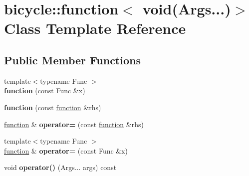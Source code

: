 \hypertarget{classbicycle_1_1function_3_01void_07_args_8_8_8_08_4}{}\section{bicycle\+:\+:function$<$ void(Args...)$>$ Class Template Reference}
\label{classbicycle_1_1function_3_01void_07_args_8_8_8_08_4}
\subsection*{Public Member Functions}
\begin{DoxyCompactItemize}
\item 
\mbox{\label{classbicycle_1_1function_3_01void_07_args_8_8_8_08_4_a7652f084a4b89af8e913ec658a4e0ca5}} 
{\footnotesize template$<$typename Func $>$ }\\{\bfseries function} (const Func \&x)
\item 
\mbox{\label{classbicycle_1_1function_3_01void_07_args_8_8_8_08_4_af2421e7cfdca2755169a449445977af2}} 
{\bfseries function} (const \hyperlink{classbicycle_1_1function}{function} \&rhs)
\item 
\mbox{\label{classbicycle_1_1function_3_01void_07_args_8_8_8_08_4_a057e6eed484cc06322126726b6b56a78}} 
\hyperlink{classbicycle_1_1function}{function} \& {\bfseries operator=} (const \hyperlink{classbicycle_1_1function}{function} \&rhs)
\item 
\mbox{\label{classbicycle_1_1function_3_01void_07_args_8_8_8_08_4_a062e23deb6c976c3a1fabc293428237c}} 
{\footnotesize template$<$typename Func $>$ }\\\hyperlink{classbicycle_1_1function}{function} \& {\bfseries operator=} (const Func \&x)
\item 
\mbox{\label{classbicycle_1_1function_3_01void_07_args_8_8_8_08_4_aa77bb97b31ca2abe49357405bbbce6bd}} 
void {\bfseries operator()} (Args... args) const
\end{DoxyCompactItemize}
